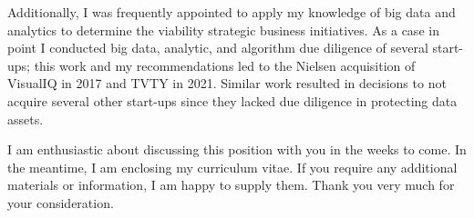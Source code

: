\vspace{2.0ex}

Additionally, I was frequently appointed to apply my knowledge of big data and analytics to determine the viability strategic business initiatives.  As a case in point I conducted big data, analytic, and algorithm due diligence of several start-ups; this work and my recommendations led to the Nielsen acquisition of VisualIQ in 2017 and TVTY in 2021.  Similar work resulted in decisions to not acquire several other start-ups since they lacked due diligence in protecting data assets. %
\\

\vspace{2.0ex}

I am enthusiastic about discussing this position with you in the weeks to come. In the meantime, I am enclosing my curriculum vitae.  If you require any additional materials or information, I am happy to supply them. Thank you very much for your consideration. \\


